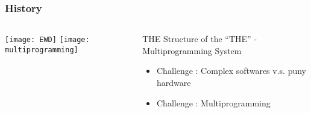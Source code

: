 \begin{frame}[plain]
	\frametitle{History}
	
	
	
	\begin{columns}
		
		\begin{column}{.4\textwidth}
			\centering
			\texttt{[image: EWD]}
			\texttt{[image: multiprogramming]}
			
			
			
		\end{column}
		
		\begin{column}{.6\textwidth}
			
			THE Structure of the “THE” - Multiprogramming System
			\begin{itemize}

				\item Challenge : Complex softwares v.s. puny hardware
				\item Challenge : Multiprogramming				
			\end{itemize}	
			
		\end{column}
		
		
	\end{columns}
	
	
\end{frame}


